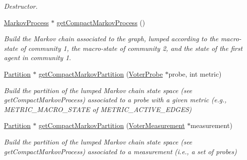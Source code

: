 \begin{DoxyCompactItemize}
\begin{DoxyCompactList}\small\item\em Destructor. \end{DoxyCompactList}\item 
\hyperlink{class_markov_process}{Markov\+Process} $\ast$ \hyperlink{class_two_communities_voter_graph_ac3e7b13e297275475e8f073ccfcac7d1}{get\+Compact\+Markov\+Process} ()
\begin{DoxyCompactList}\small\item\em Build the Markov chain associated to the graph, lumped according to the macro-\/state of community 1, the macro-\/state of community 2, and the state of the first agent in community 1. \end{DoxyCompactList}\item 
\hyperlink{class_partition}{Partition} $\ast$ \hyperlink{class_two_communities_voter_graph_a62b135ecf110717cb23fdca408f2d0cd}{get\+Compact\+Markov\+Partition} (\hyperlink{class_voter_probe}{Voter\+Probe} $\ast$probe, int metric)
\begin{DoxyCompactList}\small\item\em Build the partition of the lumped Markov chain state space (see get\+Compact\+Markov\+Process) associated to a probe with a given metric (e.\+g., M\+E\+T\+R\+I\+C\+\_\+\+M\+A\+C\+R\+O\+\_\+\+S\+T\+A\+T\+E of M\+E\+T\+R\+I\+C\+\_\+\+A\+C\+T\+I\+V\+E\+\_\+\+E\+D\+G\+E\+S) \end{DoxyCompactList}\item 
\hyperlink{class_partition}{Partition} $\ast$ \hyperlink{class_two_communities_voter_graph_a13a1a7b219d0669f750a4281edf9aecf}{get\+Compact\+Markov\+Partition} (\hyperlink{class_voter_measurement}{Voter\+Measurement} $\ast$measurement)
\begin{DoxyCompactList}\small\item\em Build the partition of the lumped Markov chain state space (see get\+Compact\+Markov\+Process) associated to a measurement (i.\+e., a set of probes) \end{DoxyCompactList}\end{DoxyCompactItemize}
